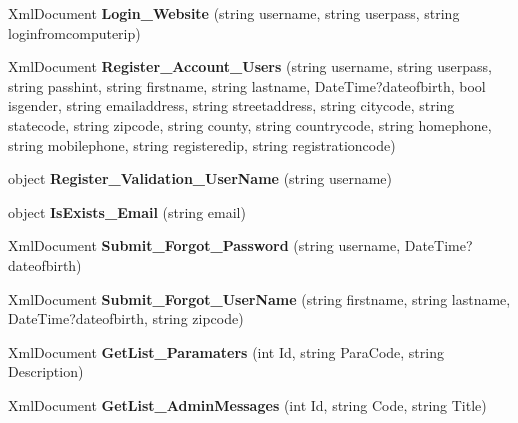 \begin{DoxyCompactItemize}
\item 
\hypertarget{class_data_service_ab14ea2c933bad00c0d3b030efcbd6fdd}{Xml\-Document {\bfseries Login\-\_\-\-Website} (string username, string userpass, string loginfromcomputerip)}\label{class_data_service_ab14ea2c933bad00c0d3b030efcbd6fdd}

\item 
\hypertarget{class_data_service_a58f5413164d46b1427a6ba3d4025dabf}{Xml\-Document {\bfseries Register\-\_\-\-Account\-\_\-\-Users} (string username, string userpass, string passhint, string firstname, string lastname, Date\-Time?dateofbirth, bool isgender, string emailaddress, string streetaddress, string citycode, string statecode, string zipcode, string county, string countrycode, string homephone, string mobilephone, string registeredip, string registrationcode)}\label{class_data_service_a58f5413164d46b1427a6ba3d4025dabf}

\item 
\hypertarget{class_data_service_aaf06a5c5fa4d1b781c64ca1f38ffbd70}{object {\bfseries Register\-\_\-\-Validation\-\_\-\-User\-Name} (string username)}\label{class_data_service_aaf06a5c5fa4d1b781c64ca1f38ffbd70}

\item 
\hypertarget{class_data_service_a839b59fbd3ef0fa253e783ce76dcbd80}{object {\bfseries Is\-Exists\-\_\-\-Email} (string email)}\label{class_data_service_a839b59fbd3ef0fa253e783ce76dcbd80}

\item 
\hypertarget{class_data_service_ab1198c93d9b795505c292fb59eacece8}{Xml\-Document {\bfseries Submit\-\_\-\-Forgot\-\_\-\-Password} (string username, Date\-Time?dateofbirth)}\label{class_data_service_ab1198c93d9b795505c292fb59eacece8}

\item 
\hypertarget{class_data_service_a574c9fa71d43d11a3e285213d9c83d45}{Xml\-Document {\bfseries Submit\-\_\-\-Forgot\-\_\-\-User\-Name} (string firstname, string lastname, Date\-Time?dateofbirth, string zipcode)}\label{class_data_service_a574c9fa71d43d11a3e285213d9c83d45}

\item 
\hypertarget{class_data_service_ac43333e23d64c30fa58c76288db1f918}{Xml\-Document {\bfseries Get\-List\-\_\-\-Paramaters} (int Id, string Para\-Code, string Description)}\label{class_data_service_ac43333e23d64c30fa58c76288db1f918}

\item 
\hypertarget{class_data_service_a948d6a7651aab7079d03b2b20db850aa}{Xml\-Document {\bfseries Get\-List\-\_\-\-Admin\-Messages} (int Id, string Code, string Title)}\label{class_data_service_a948d6a7651aab7079d03b2b20db850aa}


\end{DoxyCompactItemize}
